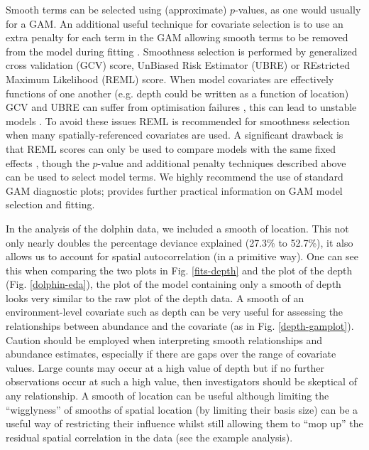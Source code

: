 \documentclass[a4paper,12pt]{article}
\begin{document}
Smooth terms can be selected using (approximate) $p$-values, as one would usually for a GAM. An additional useful technique for covariate selection is to use an extra penalty for each term in the GAM allowing smooth terms to be removed from the model during fitting \citep[illustrated in the example analysis;][]{Wood:ub}. Smoothness selection is performed by generalized cross validation (GCV) score, UnBiased Risk Estimator (UBRE) or REstricted Maximum Likelihood (REML) score. When model covariates are effectively functions of one another (e.g. depth could be written as a function of location) GCV and UBRE can suffer from optimisation failures \cite[][Section 4.5.3]{Wood:2006wz}, this can lead to unstable models \citep[][]{Wood:ub}. To avoid these issues REML is recommended for smoothness selection when many spatially-referenced covariates are used. A significant drawback is that REML scores can only be used to compare models with the same fixed effects \citep[i.e. linear terms;][]{Wood:ub}, though the $p$-value and additional penalty techniques described above can be used to select model terms. We highly recommend the use of standard GAM diagnostic plots; \cite{Wood:2006wz} provides further practical information on GAM model selection and fitting.

In the analysis of the dolphin data, we included a smooth of location. This not only nearly doubles the percentage deviance explained (27.3\% to 52.7\%), it also allows us to account for spatial autocorrelation (in a primitive way). One can see this when comparing the two plots in Fig. \ref{fits-depth} and the plot of the depth (Fig. \ref{dolphin-eda}), the plot of the model containing only a smooth of depth looks very similar to the raw plot of the depth data. A smooth of an environment-level covariate such as depth can be very useful for assessing the relationships between abundance and the covariate (as in Fig. \ref{depth-gamplot}). Caution should be employed when interpreting smooth relationships and abundance estimates, especially if there are gaps over the range of covariate values. Large counts may occur at a high value of depth but if no further observations occur at such a high value, then investigators should be skeptical of any relationship. A smooth of location can be useful although limiting the ``wigglyness'' of smooths of spatial location (by limiting their basis size) can be a useful way of restricting their influence whilst still allowing them to ``mop up'' the residual spatial correlation in the data (see the example analysis).
\end{document}
